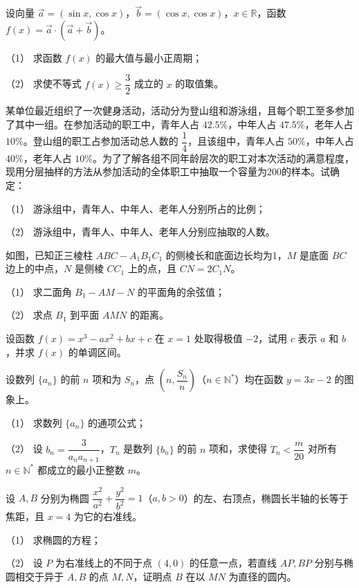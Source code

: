 \begin{question}
设向量 $\vec a=(\sin x,\cos x)$，$\vec b=(\cos x,\cos x)$，$x\in\mathbb R$，函数 $f(x)=\vec a\cdot(\vec a+\vec b)$。

（1） 求函数 $f(x)$ 的最大值与最小正周期；

（2） 求使不等式 $f(x)\geqslant\dfrac32$ 成立的 $x$ 的取值集。

\end{question}
\begin{question}
某单位最近组织了一次健身活动，活动分为登山组和游泳组，且每个职工至多参加了其中一组。在参加活动的职工中，青年人占 $42.5\%$，中年人占 $47.5\%$，老年人占 $10\%$。登山组的职工占参加活动总人数的 $\dfrac14$，且该组中，青年人占 $50\%$，中年人占 $40\%$，老年人占 $10\%$。为了了解各组不同年龄层次的职工对本次活动的满意程度，现用分层抽样的方法从参加活动的全体职工中抽取一个容量为200的样本。试确定：

（1） 游泳组中，青年人、中年人、老年人分别所占的比例；

（2） 游泳组中，青年人、中年人、老年人分别应抽取的人数。

\Needspace{0.4\textheight}
\end{question}
\begin{question}
如图，已知正三棱柱 $ABC-A_1B_1C_1$ 的侧棱长和底面边长均为1，$M$ 是底面 $BC$ 边上的中点，$N$ 是侧棱 $CC_1$ 上的点，且 $CN=2C_1N$。
\nopagebreak[4]
\begin{center}\end{center}
\nopagebreak[4]
（1） 求二面角 $B_1-AM-N$ 的平面角的余弦值；

（2） 求点 $B_1$ 到平面 $AMN$ 的距离。

\end{question}
\begin{question}
设函数 $f(x)=x^3-ax^2+bx+c$ 在 $x=1$ 处取得极值 $-2$，试用 $c$ 表示 $a$ 和 $b$，并求 $f(x)$ 的单调区间。

\end{question}
\begin{question}
设数列 $\{a_n\}$ 的前 $n$ 项和为 $S_n$，点 $\left(n,\dfrac{S_n}{n}\right)$（$n\in\mathbb N^*$）均在函数 $y=3x-2$ 的图象上。

（1） 求数列 $\{a_n\}$ 的通项公式；

（2） 设 $b_n=\dfrac{3}{a_na_{n+1}}$，$T_n$ 是数列 $\{b_n\}$ 的前 $n$ 项和，求使得 $T_n<\dfrac m{20}$ 对所有 $n\in\mathbb N^*$ 都成立的最小正整数 $m$。

\end{question}
\begin{question}
设 $A,B$ 分别为椭圆 $\dfrac{x^2}{a^2}+\dfrac{y^2}{b^2}=1$（$a,b>0$）的左、右顶点，椭圆长半轴的长等于焦距，且 $x=4$ 为它的右准线。

（1） 求椭圆的方程；

（2） 设 $P$ 为右准线上的不同于点 $(4,0)$ 的任意一点，若直线 $AP,BP$ 分别与椭圆相交于异于 $A,B$ 的点 $M,N$，证明点 $B$ 在以 $MN$ 为直径的圆内。

\end{question}